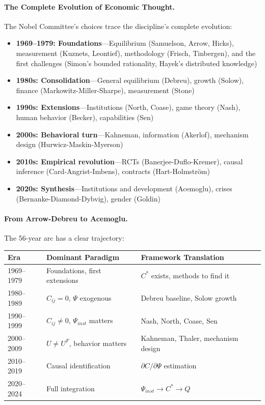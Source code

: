 \paragraph{The Complete Evolution of Economic Thought.}
The Nobel Committee's choices trace the discipline's complete evolution:
\begin{itemize}
  \item \textbf{1969--1979: Foundations}---Equilibrium (Samuelson, Arrow, Hicks), 
        measurement (Kuznets, Leontief), methodology (Frisch, Tinbergen),
        and the first challenges (Simon's bounded rationality, Hayek's distributed knowledge)
  \item \textbf{1980s: Consolidation}---General equilibrium (Debreu), growth (Solow), 
        finance (Markowitz-Miller-Sharpe), measurement (Stone)
  \item \textbf{1990s: Extensions}---Institutions (North, Coase), game theory (Nash),
        human behavior (Becker), capabilities (Sen)
  \item \textbf{2000s: Behavioral turn}---Kahneman, information (Akerlof),
        mechanism design (Hurwicz-Maskin-Myerson)
  \item \textbf{2010s: Empirical revolution}---RCTs (Banerjee-Duflo-Kremer),
        causal inference (Card-Angrist-Imbens), contracts (Hart-Holmström)
  \item \textbf{2020s: Synthesis}---Institutions and development (Acemoglu),
        crises (Bernanke-Diamond-Dybvig), gender (Goldin)
\end{itemize}

\paragraph{From Arrow-Debreu to Acemoglu.}
The 56-year arc has a clear trajectory:
\begin{center}
\renewcommand{\arraystretch}{1.2}
\begin{tabular}{lll}
\hline
\textbf{Era} & \textbf{Dominant Paradigm} & \textbf{Framework Translation} \\
\hline
1969--1979 & Foundations, first extensions & $C^*$ exists, methods to find it \\
1980--1989 & $C_{ij} = 0$, $\Psi$ exogenous & Debreu baseline, Solow growth \\
1990--1999 & $C_{ij} \neq 0$, $\Psi_{inst}$ matters & Nash, North, Coase, Sen \\
2000--2009 & $U \neq U^F$, behavior matters & Kahneman, Thaler, mechanism design \\
2010--2019 & Causal identification & $\partial C / \partial \Psi$ estimation \\
2020--2024 & Full integration & $\Psi_{inst} \to C^* \to Q$ \\
\hline
\end{tabular}
\end{center}

